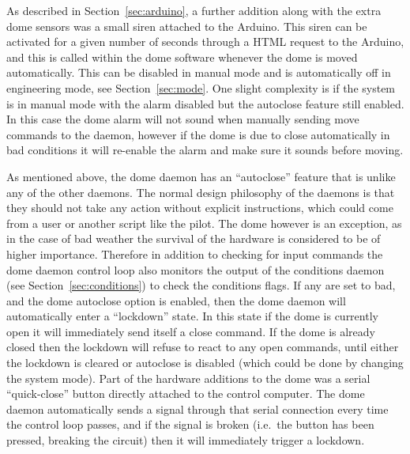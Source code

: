 \begin{colsection}
\begin{colsection}
As described in Section~\ref{sec:arduino}, a further addition along with the extra dome sensors was a small siren attached to the Arduino. This siren can be activated for a given number of seconds through a HTML request to the Arduino, and this is called within the dome software whenever the dome is moved automatically. This can be disabled in manual mode and is automatically off in engineering mode, see Section~\ref{sec:mode}. One slight complexity is if the system is in manual mode with the alarm disabled but the autoclose feature still enabled. In this case the dome alarm will not sound when manually sending move commands to the daemon, however if the dome is due to close automatically in bad conditions it will re-enable the alarm and make sure it sounds before moving.

As mentioned above, the dome daemon has an ``autoclose'' feature that is unlike any of the other daemons. The normal design philosophy of the daemons is that they should not take any action without explicit instructions, which could come from a user or another script like the pilot. The dome however is an exception, as in the case of bad weather the survival of the hardware is considered to be of higher importance. Therefore in addition to checking for input commands the dome daemon control loop also monitors the output of the conditions daemon (see Section~\ref{sec:conditions}) to check the conditions flags. If any are set to bad, and the dome autoclose option is enabled, then the dome daemon will automatically enter a ``lockdown'' state. In this state if the dome is currently open it will immediately send itself a close command. If the dome is already closed then the lockdown will refuse to react to any open commands, until either the lockdown is cleared or autoclose is disabled (which could be done by changing the system mode). Part of the hardware additions to the dome was a serial ``quick-close'' button directly attached to the control computer. The dome daemon automatically sends a signal through that serial connection every time the control loop passes, and if the signal is broken (i.e.\ the button has been pressed, breaking the circuit) then it will immediately trigger a lockdown.


\end{colsection}
\end{colsection}
